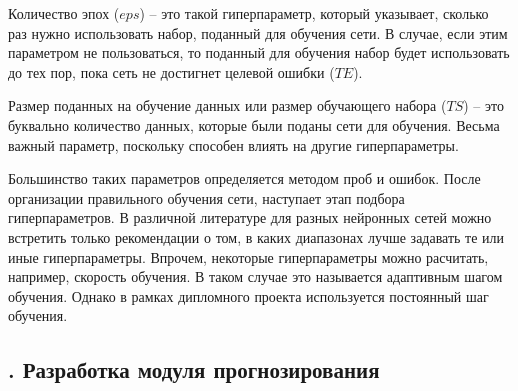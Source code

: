 {  \par \redline Количество эпох ($eps$) {--} это такой гиперпараметр, который указывает, сколько раз нужно использовать набор, поданный для обучения сети. В случае, если этим параметром не пользоваться, то поданный для обучения набор будет использовать до тех пор, пока сеть не достигнет целевой ошибки ($TE$).

  \par \redline Размер поданных на обучение данных или размер обучающего набора ($TS$) {--} это буквально количество данных, которые были поданы сети для обучения. Весьма важный параметр, поскольку способен влиять на другие гиперпараметры. 

  \par \redline Большинство таких параметров определяется методом проб и ошибок. После организации правильного обучения сети, наступает этап подбора гиперпараметров. В различной литературе для разных нейронных сетей можно встретить только рекомендации о том, в каких диапазонах лучше задавать те или иные гиперпараметры. Впрочем, некоторые гиперпараметры можно расчитать, например, скорость обучения. В таком случае это называется адаптивным шагом обучения. Однако в рамках дипломного проекта используется постоянный шаг обучения. 

  \par 
}

\subtitlespace

\subsection*{ 
  \gostTitleFont
  \redline
  \thechaptercntr .\thesubchaptercntr \spc 
  Разработка модуля прогнозирования
} \addtocounter{subchaptercntr}{1} 
  
\subtitlespace
  
